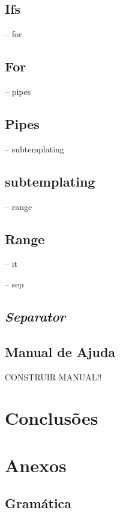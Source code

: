 \documentclass[runningheads]{llncs}
\begin{document}
\subsection{Ifs}

-- for
\subsection{For}

-- pipes
\subsection{Pipes}

-- subtemplating
\subsection{subtemplating}

-- range
\subsection{Range}

-- it 

-- sep 
\subsection{\textit{Separator}}


\subsection{Manual de Ajuda}
CONSTRUIR MANUAL!!

\section{Conclusões}



\section{Anexos}\label{sec:anexos}

\subsection*{Gramática} \label{fig:grammar}
\inputminted{bash}{assets/gramatica.txt}

%
%
%
% 
% 


\end{document}
